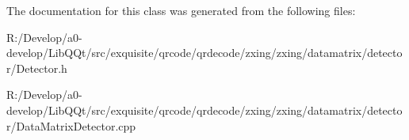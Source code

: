 The documentation for this class was generated from the following files\+:\begin{DoxyCompactItemize}
\item 
R\+:/\+Develop/a0-\/develop/\+Lib\+Q\+Qt/src/exquisite/qrcode/qrdecode/zxing/zxing/datamatrix/detector/Detector.\+h\item 
R\+:/\+Develop/a0-\/develop/\+Lib\+Q\+Qt/src/exquisite/qrcode/qrdecode/zxing/zxing/datamatrix/detector/Data\+Matrix\+Detector.\+cpp\end{DoxyCompactItemize}
